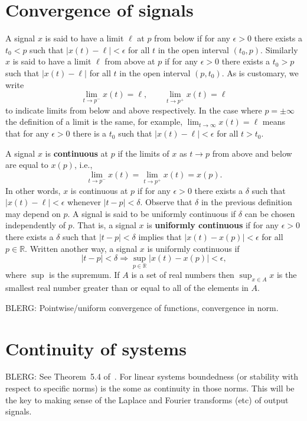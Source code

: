 \documentclass[11pt,a4paper]{book}
\theoremstyle{plain}
\numberwithin{equation}{section}
\newcommand{\reals}{{\mathbb R}}
\newcommand{\term}{\textbf}
\newcommand{\abs}[1]{\left\vert #1 \right\vert}
\newcommand{\secmark}{}
\newcommand{\marktotoc}[1]{\renewcommand{\secmark}{#1}}
\newenvironment{advanced}{
  \renewcommand{\secmark}{*}%
  \addtocontents{toc}{\protect\marktotoc{*}}
}
{\addtocontents{toc}{\protect\marktotoc{}}}
\begin{document}
\begin{advanced}

\section{Convergence of signals}

A signal $x$ is said to have a limit $\ell$ at $p$ from below if for any $\epsilon > 0$ there exists a $t_0 <  p$ such that $\abs{x(t) - \ell} < \epsilon$ for all $t$ in the open interval $(t_0, p)$.  Similarly $x$ is said to have a limit $\ell$ from above at $p$ if for any $\epsilon > 0$ there exists a $t_0 > p$ such that $\abs{x(t) - \ell}$ for all $t$ in the open interval $(p, t_0)$.  As is customary, we write
\[
\lim_{t \to p^-} x(t) = \ell, \qquad \lim_{t \to p^+} x(t) = \ell
\]
to indicate limits from below and above respectively.  In the case where $p = \pm \infty$ the definition of a limit is the same, for example, $\lim_{t \rightarrow \infty} x(t) = \ell$ means that for any $\epsilon > 0$ there is a $t_0$ such that $\abs{x(t) - \ell} < \epsilon$ for all $t > t_0$.

A signal $x$ is \term{continuous} at $p$ if the limits of $x$ as $t \rightarrow p$ from above and below are equal to $x(p)$, i.e.,
\[
\lim_{t \to p^-} x(t) = \lim_{t \to p^+} x(t) = x(p).
\]
In other words, $x$ is continuous at $p$ if for any $\epsilon > 0$ there exists a $\delta$ such that $\abs{x(t) - \ell} < \epsilon$ whenever $\abs{t - p} < \delta$.  Observe that $\delta$ in the previous definition may depend on $p$.  A signal is said to be uniformly continuous if $\delta$ can be chosen independently of $p$.  That is, a signal $x$ is \term{uniformly continuous} if for any $\epsilon > 0$ there exists a $\delta$ such that $\abs{t - p} < \delta$ implies that $\abs{x(t) - x(p)} < \epsilon$ for all $p \in \reals$.  Written another way, a signal $x$ is uniformly continuous if
\[
\abs{t - p} < \delta \Rightarrow \sup_{p \in \reals} \abs{x(t) - x(p)} < \epsilon,
\]
where $\sup$ is the supremum.  If $A$ is a set of real numbers then $\sup_{x \in A} x$ is the smallest real number greater than or equal to all of the elements in $A$. 

BLERG: Pointwise/uniform convergence of functions, convergence in norm.


\section{Continuity of systems}

BLERG: See Theorem~5.4 of~\cite{Rudin_real_and_complex_analysis}.  For linear systems boundedness (or stability with respect to specific norms) is the some as continuity in those norms.  This will be the key to making sense of the Laplace and Fourier transforms (etc) of output signals.

\end{advanced}
\end{document}
